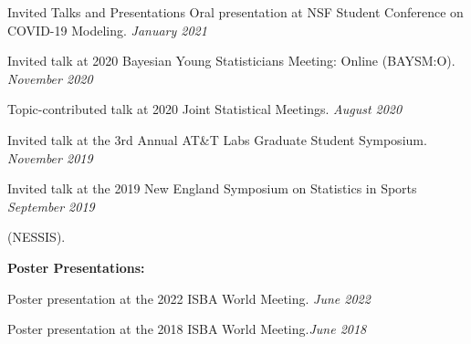 \documentclass{resume} %
\begin{document}
\begin{rSection}{Invited Talks and Presentations}
	{Oral presentation at NSF Student Conference on COVID-19 Modeling.} \hfill {\em January 2021}
	
	{Invited talk at 2020 Bayesian Young Statisticians Meeting: Online (BAYSM:O).} \hfill {\em November 2020}
	
	{Topic-contributed talk at 2020 Joint Statistical Meetings. } \hfill {\em August 2020}
	
	{Invited talk at the 3rd Annual AT\&T Labs Graduate Student Symposium.} \hfill {\em November 2019}
	
	
	{Invited talk at the 2019 New England Symposium on Statistics in Sports} \hfill {\em September 2019}
	
	\vspace{-0.1in}
	(NESSIS).
	
	
	
	
	
	\medskip
	
	\hspace*{-0.2in}\textbf{Poster Presentations:}
	
	Poster presentation at the 2022 ISBA World Meeting. \hfill {\em June 2022}
	
	
%	
	
	
	
	Poster presentation at the 2018 ISBA World Meeting.\hfill {\em June 2018}
	
	
	
\end{rSection}
\end{document}
